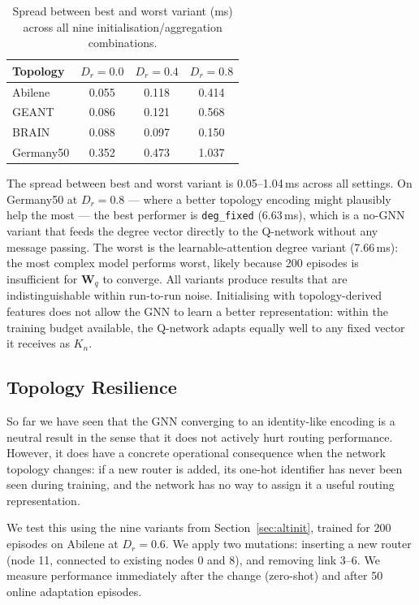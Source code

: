 \documentclass[10pt,twocolumn,letterpaper]{article}
\begin{document}
\begin{table}[t]
\centering
\caption{Spread between best and worst variant (ms) across all nine
initialisation/aggregation combinations.}
\label{tab:initspread}
\small
\setlength{\tabcolsep}{4pt}
\begin{tabular}{lccc}
\toprule
Topology  & $D_r = 0.0$ & $D_r = 0.4$ & $D_r = 0.8$ \\
\midrule
Abilene   & 0.055 & 0.118 & 0.414 \\
GEANT     & 0.086 & 0.121 & 0.568 \\
BRAIN     & 0.088 & 0.097 & 0.150 \\
Germany50 & 0.352 & 0.473 & 1.037 \\
\bottomrule
\end{tabular}
\end{table}

The spread between best and worst variant is 0.05--1.04\,ms across all settings. On Germany50 at $D_r = 0.8$ --- where a better topology encoding might plausibly help the most --- the best performer is \texttt{deg\_fixed} (6.63\,ms), which is a no-GNN variant that feeds the degree vector directly to the Q-network without any message passing. The worst is the learnable-attention degree variant (7.66\,ms): the most complex model performs worst, likely because 200 episodes is insufficient for $\mathbf{W}_q$ to converge. All variants produce results that are indistinguishable within run-to-run noise. Initialising with topology-derived features does not allow the GNN to learn a better representation: within the training budget available, the Q-network adapts equally well to any fixed vector it receives as $K_n$.

\subsection{Topology Resilience}
\label{sec:resilience}

So far we have seen that the GNN converging to an identity-like encoding is a neutral result in the sense that it does not actively hurt routing performance. However, it does have a concrete operational consequence when the network topology changes: if a new router is added, its one-hot identifier has never been seen during training, and the network has no way to assign it a useful routing representation.

We test this using the nine variants from Section~\ref{sec:altinit}, trained for 200 episodes on Abilene at $D_r = 0.6$. We apply two mutations: inserting a new router (node 11, connected to existing nodes 0 and 8), and removing link 3--6. We measure performance immediately after the change (zero-shot) and after 50 online adaptation episodes.
\end{document}
